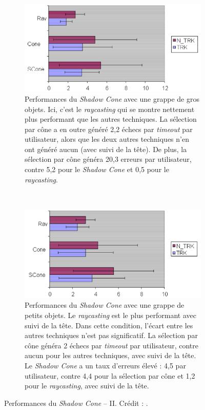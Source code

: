 		
	\begin{figure}[!htb]
		\begin{subfigure}[t]{0.49\textwidth}
			\centering
			\includegraphics[width=\textwidth]{figures/ch2/shadowCLarge}
			\caption{Performances du \emph{Shadow Cone} avec une grappe de gros objets. Ici, c'est le \emph{raycasting} qui se montre nettement plus performant que les autres techniques. La sélection par cône a en outre généré 2,2 échecs par \emph{timeout} par utilisateur, alors que les deux autres techniques n'en ont généré aucun (avec suivi de la tête). De plus, la sélection par cône généra 20,3 erreurs par utilisateur, contre 5,2 pour le \emph{Shadow Cone} et 0,5 pour le \emph{raycasting}.}
			\label{fig:shadowCLarge}
		\end{subfigure}
		~
		\begin{subfigure}[t]{0.49\textwidth}
			\centering
			\includegraphics[width=\textwidth]{figures/ch2/shadowCSmall}
			\caption{Performances du \emph{Shadow Cone} avec une grappe de petits objets. Le \emph{raycasting} est le plus performant avec suivi de la tête. Dans cette condition, l'écart entre les autres techniques n'est pas significatif. La sélection par cône généra 2 échecs par \emph{timeout} par utilisateur, contre aucun pour les autres techniques, avec suivi de la tête. Le \emph{Shadow Cone} a un taux d'erreurs élevé : 4,5 par utilisateur, contre 4,4 pour la sélection par cône et 1,2 pour le \emph{raycasting}, avec suivi de la tête.}
			\label{fig:shadowCSmall}
		\end{subfigure}
		\caption[Performances du \emph{Shadow Cone} -- II]{Performances du \emph{Shadow Cone} -- II. Crédit : \cite{steed20043d}.}
		\label{fig:shadowConePerf3}
	\end{figure}
	
